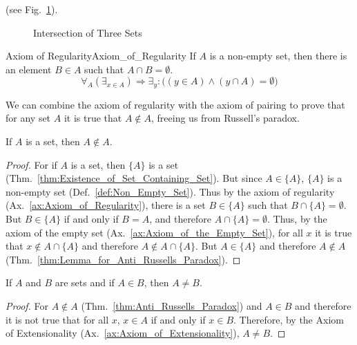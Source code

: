         (see Fig.~\ref{fig:Intersection_of_Three_Sets}).
        \begin{figure}[H]
            \centering
            
            \caption{Intersection of Three Sets}
            \label{fig:Intersection_of_Three_Sets}
        \end{figure}
        \begin{faxiom}{Axiom of Regularity}{Axiom_of_Regularity}
            If $A$ is a non-empty set, then there is an element $B\in{A}$
            such that $A\cap{B}=\emptyset$.
            \begin{equation*}
                \forall_{A}(\exists_{x\in{A}})\Rightarrow
                \exists_{y}:\big((y\in{A})\land(y\cap{A})=\emptyset\big)
            \end{equation*}
        \end{faxiom}
        We can combine the axiom of regularity with the axiom of pairing to
        prove that for any set $A$ it is true that $A\notin{A}$, freeing us from
        Russell's paradox.
        \begin{theorem}
            \label{thm:Anti_Russells_Paradox}%
            If $A$ is a set, then $A\notin{A}$.
        \end{theorem}
        \begin{proof}
            For if $A$ is a set, then $\{A\}$ is a set
            (Thm.~\ref{thm:Existence_of_Set_Containing_Set}). But since
            $A\in\{A\}$, $\{A\}$ is a non-empty set
            (Def.~\ref{def:Non_Empty_Set}). Thus by the axiom of regularity
            (Ax.~\ref{ax:Axiom_of_Regularity}), there is a set $B\in\{A\}$ such
            that $B\cap\{A\}=\emptyset$. But $B\in\{A\}$ if and only if
            $B=A$, and therefore $A\cap\{A\}=\emptyset$. Thus, by the axiom of
            the empty set (Ax.~\ref{ax:Axiom_of_the_Empty_Set}), for all $x$ it
            is true that $x\notin{A}\cap\{A\}$ and therefore
            $A\notin{A}\cap\{A\}$. But $A\in\{A\}$ and therefore
            $A\notin{A}$ (Thm.~\ref{thm:Lemma_for_Anti_Russells_Paradox}).
        \end{proof}
        \begin{theorem}
            \label{thm:Containment_NEqual_Underlying_Set}%
            If $A$ and $B$ are sets and if $A\in{B}$, then $A\ne{B}$.
        \end{theorem}
        \begin{proof}
            For $A\notin{A}$ (Thm.~\ref{thm:Anti_Russells_Paradox}) and
            $A\in{B}$ and therefore it is not true that for all $x$, $x\in{A}$
            if and only if $x\in{B}$. Therefore, by the Axiom of
            Extensionality (Ax.~\ref{ax:Axiom_of_Extensionality}), $A\ne{B}$.
        \end{proof}
